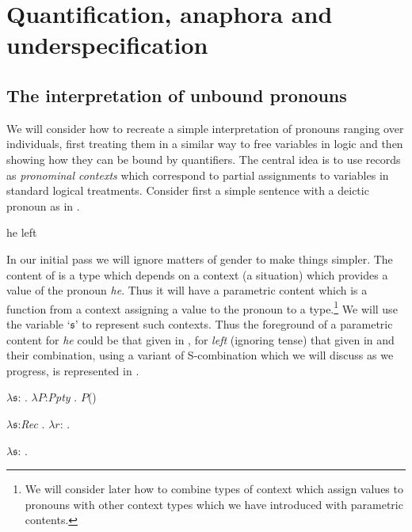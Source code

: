 \chapter{Quantification, anaphora and underspecification}
\label{ch:quant}
\setcounter{equation}{0}

\section{The interpretation of unbound pronouns}
\label{sec:unbound}
We will consider how to recreate a simple interpretation of pronouns
ranging over individuals, first treating them in a similar way to free
variables in logic and then showing how they can be bound by
quantifiers.  The central idea is to use records as \textit{pronominal
  contexts} which correspond to partial assignments to variables in
standard logical treatments.  Consider first a simple sentence with a deictic
pronoun as in \nexteg{}.
\begin{ex} 
he left 
\end{ex} 
In our initial pass we will ignore matters
of gender to make things simpler.  The content of \preveg{} is a type
which depends on a context (a situation) which provides a value of the
pronoun \textit{he}. Thus it will have a parametric content which is a
function from a context assigning a value to the pronoun to a
type.\footnote{We will consider later how to combine types of context
  which assign values to pronouns with other context types which we
  have introduced with parametric contents.}  We will use the variable
`$\mathfrak{s}$' to represent such contexts.  Thus the foreground of a parametric content for
\textit{he} could be that given in , for \textit{left}
(ignoring tense) that given in  and their combination, using a variant
of S-combination which we will discuss as we progress, is represented
in .
\begin{ex} 
\begin{subex} 
 
\item $\lambda\mathfrak{s}$: . 
        $\lambda P$:\textit{Ppty} . $P$()
 
\item $\lambda\mathfrak{s}$:\textit{Rec} . 
        $\lambda r$: . 

\item $\lambda\mathfrak{s}$:
  . 
 
\end{subex} 
   
\end{ex}
